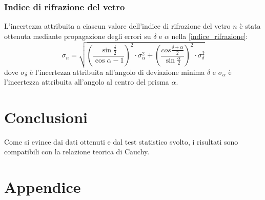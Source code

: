 \documentclass[]{article}
\let\oldsection\section%
\renewcommand{\section}{%
	\renewcommand{\theequation}{\thesection.\arabic{equation}}%
	\oldsection}%
\begin{document}
    \label{par:dev_min_err}

    \subsubsection{Indice di rifrazione del vetro}
    L'incertezza attribuita a ciascun valore dell'indice di rifrazione del vetro $n$ è stata ottenuta mediante propagazione degli errori su $\delta$ e $\alpha$ nella \ref{indice_rifrazione}:
    \begin{equation}
        \label{sigma-n}
        \sigma_n = \sqrt{ \left(\frac{\sin{\frac{\delta}{2}}}{\cos{\alpha}-1}\right)^2 \cdot \sigma_{\alpha}^2 + \left(\frac{cos{\frac{\delta + \alpha}{2}}}{\sin{\frac{\alpha}{2}}}\right)^2 \cdot \sigma_{\delta}^2   }
    \end{equation}
    dove $\sigma_{\delta}$ è l'incertezza attribuita all'angolo di deviazione minima $\delta$ e $\sigma_{\alpha}$ è l'incertezza attribuita all'angolo al centro del prisma $\alpha$.

    \section{Conclusioni}
    Come si evince dai dati ottenuti e dal test statistico svolto, i risultati sono compatibili con la relazione teorica di Cauchy.

    \newpage

    \section*{Appendice}
\end{document}
